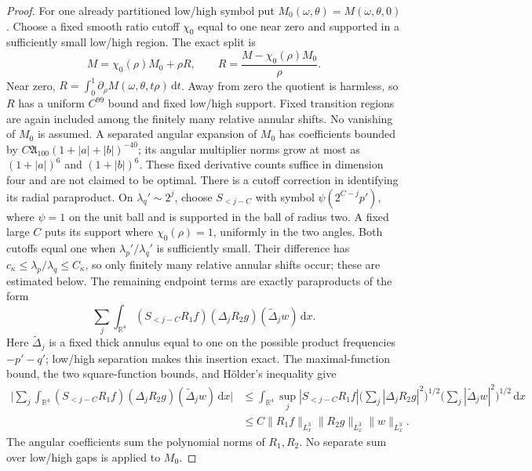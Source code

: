 \documentclass[11pt,a4paper]{article}
\numberwithin{equation}{section}
\newcommand{\dd}{\mathrm d}
\newcommand{\R}{\mathbb R}
\newcommand{\f}[2]{\frac{#1}{#2}}
\theoremstyle{definition}
\begin{document}
\begin{proof}
For one already partitioned low/high symbol put
$M_0(\omega,\theta)=M(\omega,\theta,0)$. Choose a fixed smooth ratio
cutoff $\chi_0$ equal to one near zero and supported in a sufficiently
small low/high region. The exact split is
\begin{equation*}
M=\chi_0(\rho)M_0+\rho R,\qquad
R=\f{M-\chi_0(\rho)M_0}{\rho}.
\end{equation*}
Near zero, $R=\int_0^1\partial_\rho M(\omega,\theta,t\rho)\,\dd t$.
Away from zero the quotient is harmless, so $R$ has a uniform
$C^{99}$ bound and fixed low/high support. Fixed transition regions
are again included among the finitely many relative annular shifts.
No vanishing of $M_0$ is assumed. A separated angular expansion of
$M_0$ has coefficients bounded
by $C\mathfrak A_{100}(1+|a|+|b|)^{-40}$; its angular multiplier norms
grow at most as $(1+|a|)^6$ and $(1+|b|)^6$. These fixed derivative
counts suffice in dimension four and are not claimed to be optimal.
There is a cutoff correction in identifying its radial paraproduct.
On $\lambda_q'\sim2^j$, choose
$S_{<j-C}$ with symbol $\psi(2^{C-j}p')$, where $\psi=1$ on the
unit ball and is supported in the ball of radius two. A fixed large
$C$ puts its support where $\chi_0(\rho)=1$, uniformly in the
two angles. Both cutoffs equal one when $\lambda_p'/\lambda_q'$ is sufficiently
small. Their difference has $c_\kappa\leq \lambda_p/\lambda_q\leq C_\kappa$, so only
finitely many relative annular shifts occur; these are estimated below.
The remaining endpoint terms are exactly paraproducts of the form
\begin{equation*}
\sum_j\int_{\R^4}
(S_{<j-C}R_1f)(\Delta_jR_2g)(\widetilde\Delta_jw)\,\dd x.
\end{equation*}
Here $\widetilde\Delta_j$ is a fixed thick annulus equal to one on
the possible product frequencies $-p'-q'$; low/high separation makes
this insertion exact. The maximal-function bound, the two square-function
bounds, and H\"older's inequality give
\begin{equation*}
\begin{aligned}
\bigg|\sum_j\int_{\R^4}
 (S_{<j-C}R_1f)(\Delta_jR_2g)(\widetilde\Delta_jw)\,\dd x\bigg|
&\leq\int_{\R^4}\sup_j|S_{<j-C}R_1f|
 \bigg(\sum_j|\Delta_jR_2g|^2\bigg)^{1/2}
 \bigg(\sum_j|\widetilde\Delta_jw|^2\bigg)^{1/2}\,\dd x\\
&\leq C\|R_1f\|_{L^3_x}\|R_2g\|_{L^3_x}\|w\|_{L^3_x}.
\end{aligned}
\end{equation*}
The angular coefficients sum the polynomial norms of $R_1,R_2$.
No separate sum over low/high gaps is applied to $M_0$.


\end{proof}
\end{document}
